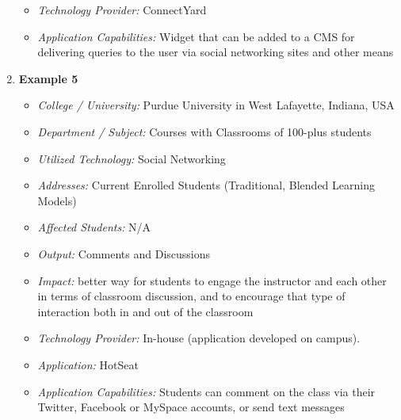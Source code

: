 \documentclass[12pt,a4paper,final,twoside,onecolumn,titlepage]{book}
\begin{document}
\begin{enumerate}
\begin{itemize}
\item \textit{Technology Provider:} ConnectYard
\item \textit{Application Capabilities:} Widget that can be added to a \gls{CMS} for delivering queries to the user via social networking sites and other means
\end{itemize}
\item \textbf{Example 5}
\begin{itemize}
\item \textit{College / University:} Purdue University in West Lafayette, Indiana, USA
\item \textit{Department / Subject:} Courses with Classrooms of 100-plus students
\item \textit{Utilized Technology:} Social Networking
\item \textit{Addresses:} Current Enrolled Students (Traditional, Blended Learning Models)
\item \textit{Affected Students:} N/A
\item \textit{Output:} Comments and Discussions
\item \textit{Impact:} better way for students to engage the instructor and each other in terms of classroom discussion, and to encourage that type of interaction both in and out of the classroom 
\item \textit{Technology Provider:} In-house (application developed on campus). 
\item \textit{Application:} HotSeat
\item \textit{Application Capabilities:} Students can comment on the class via their Twitter, Facebook or MySpace accounts, or send text messages
\end{itemize}
\end{enumerate}
\end{document}
